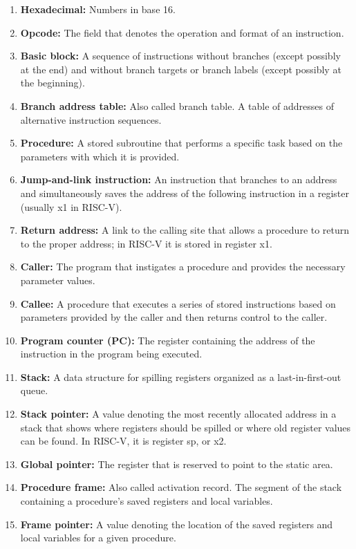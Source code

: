 \documentclass{article}
\begin{document}
\begin{enumerate}[label=\arabic*.]
    \item \textbf{Hexadecimal:} Numbers in base 16.
    \item \textbf{Opcode:} The field that denotes the operation and format of an instruction.
    \item \textbf{Basic block:} A sequence of instructions without branches (except possibly at the end) and without branch targets or branch labels (except possibly at the beginning).
    \item \textbf{Branch address table:} Also called branch table. A table of addresses of alternative instruction sequences.
    \item \textbf{Procedure:} A stored subroutine that performs a specific task based on the parameters with which it is provided.
    \item \textbf{Jump-and-link instruction:} An instruction that branches to an address and simultaneously saves the address of the following instruction in a register (usually x1 in RISC-V).
    \item \textbf{Return address:} A link to the calling site that allows a procedure to return to the proper address; in RISC-V it is stored in register x1.
    \item \textbf{Caller:} The program that instigates a procedure and provides the necessary parameter values.
    \item \textbf{Callee:} A procedure that executes a series of stored instructions based on parameters provided by the caller and then returns control to the caller.
    \item \textbf{Program counter (PC):} The register containing the address of the instruction in the program being executed.
    \item \textbf{Stack:} A data structure for spilling registers organized as a last-in-first-out queue.
    \item \textbf{Stack pointer:} A value denoting the most recently allocated address in a stack that shows where registers should be spilled or where old register values can be found. In RISC-V, it is register sp, or x2.
    \item \textbf{Global pointer:} The register that is reserved to point to the static area.
    \item \textbf{Procedure frame:} Also called activation record. The segment of the stack containing a procedure’s saved registers and local variables.
    \item \textbf{Frame pointer:} A value denoting the location of the saved registers and local variables for a given procedure.

\end{enumerate}
\end{document}
